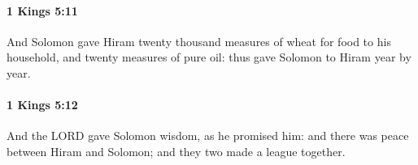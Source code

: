 		\paragraph{1 Kings 5:11} %
			\label{1KINGS-5-11}

			And Solomon gave Hiram twenty thousand measures of wheat for food to his household, and twenty measures of pure oil: thus gave Solomon to Hiram year by year.


		\paragraph{1 Kings 5:12} %
			\label{1KINGS-5-12}

			And the LORD gave Solomon wisdom, as he promised him: and there was peace between Hiram and Solomon; and they two made a league together.


